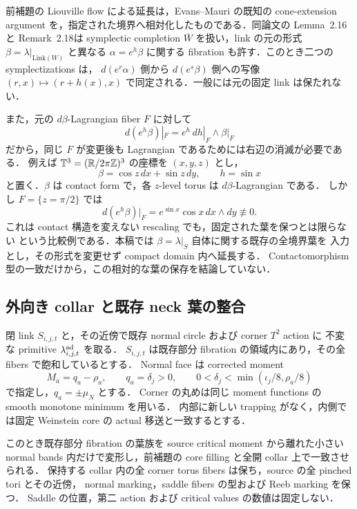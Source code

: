 \begin{remark}
\label{ke:contact-rescaling-collar-scope}
前補題の Liouville flow による延長は，Evans--Mauri の既知の cone-extension
argument を，指定された境界へ相対化したものである．同論文の
Lemma~2.16 と Remark~2.18\cite[pp.~543--544]{EM}は symplectic completion
$\overline W$ を扱い，link の元の形式 $\beta=\lambda|_{\mathrm{Link}(W)}$ と異なる
$\alpha=e^h\beta$ に関する fibration も許す．このとき二つの symplectizations は，
$d(e^r\alpha)$ 側から $d(e^s\beta)$ 側への写像
$(r,x)\mapsto(r+h(x),x)$ で同定される．一般には元の固定 link は保たれない．

また，元の $d\beta$-Lagrangian fiber $F$ に対して
\[
 d(e^h\beta)|_F=e^h\,dh|_F\wedge\beta|_F
\]
だから，同じ $F$ が変更後も Lagrangian であるためには右辺の消滅が必要である．
例えば $\mathbb T^3=(\mathbb R/2\pi\mathbb Z)^3$ の座標を $(x,y,z)$ とし，
\[
 \beta=\cos z\,dx+\sin z\,dy,\qquad h=\sin x
\]
と置く．$\beta$ は contact form で，各 $z$-level torus は $d\beta$-Lagrangian である．
しかし $F=\{z=\pi/2\}$ では
\[
 d(e^h\beta)|_F=e^{\sin x}\cos x\,dx\wedge dy\not\equiv0 .
\]
これは contact 構造を変えない rescaling でも，固定された葉を保つとは限らない
という比較例である．本稿では $\beta=\lambda|_S$ 自体に関する既存の全境界葉を
入力とし，その形式を変更せず compact domain 内へ延長する．
Contactomorphism 型の一致だけから，この相対的な葉の保存を結論していない．
\end{remark}

\subsection{外向き collar と既存 neck 葉の整合}

\begin{proposition}
\label{ke:link-relative-collar-gluing}
閉 link $S_{i,j,t}$ と，その近傍で既存 normal circle および corner $T^2$ action に
不変な primitive $\lambda^{\rm ad}_{i,j,t}$ を取る．
$S_{i,j,t}$ は既存部分 fibration の領域内にあり，その全 fibers で飽和しているとする．
Normal face は corrected moment
\[
 M_a=q_a-\rho_a,\qquad q_a=\delta_j>0,\qquad
 0<\delta_j<\min(\iota_j/8,\rho_a/8)
\]
で指定し，$q_a=\pm\widehat\mu_N$ とする．
Corner の丸めは同じ moment functions の smooth monotone minimum を用いる．
内部に新しい trapping がなく，内側では固定 Weinstein core の actual 移送と一致するとする．

このとき既存部分 fibration の葉族を source critical moment から離れた小さい
normal bands 内だけで変形し，前補題の core filling と全開 collar 上で一致させられる．
保持する collar 内の全 corner torus fibers は保ち，source の全 pinched tori とその近傍，
normal marking，saddle fibers の型および Reeb marking を保つ．
Saddle の位置，第二 action および critical values の数値は固定しない．
\end{proposition}

